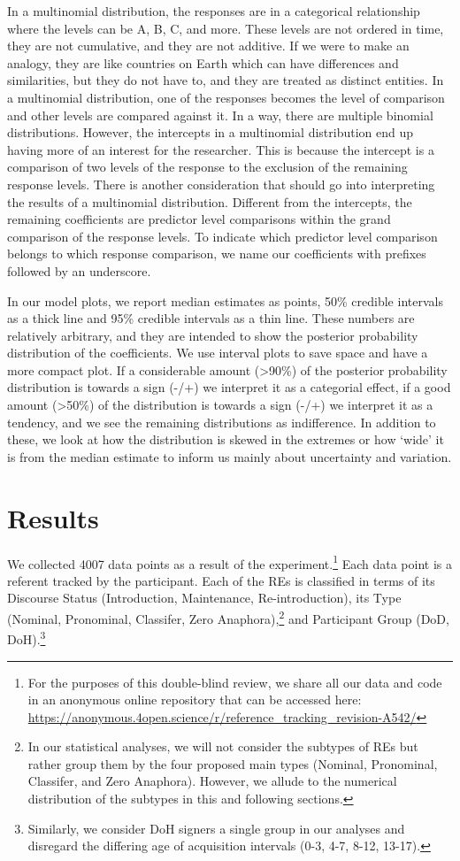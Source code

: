 \documentclass[]{elsarticle} %
\begin{document}
In a multinomial distribution, the responses are in a categorical
relationship where the levels can be A, B, C, and more. These levels are
not ordered in time, they are not cumulative, and they are not additive.
If we were to make an analogy, they are like countries on Earth which
can have differences and similarities, but they do not have to, and they
are treated as distinct entities. In a multinomial distribution, one of
the responses becomes the level of comparison and other levels are
compared against it. In a way, there are multiple binomial
distributions. However, the intercepts in a multinomial distribution end
up having more of an interest for the researcher. This is because the
intercept is a comparison of two levels of the response to the exclusion
of the remaining response levels. There is another consideration that
should go into interpreting the results of a multinomial distribution.
Different from the intercepts, the remaining coefficients are predictor
level comparisons within the grand comparison of the response levels. To
indicate which predictor level comparison belongs to which response
comparison, we name our coefficients with prefixes followed by an
underscore.

In our model plots, we report median estimates as points, 50\% credible
intervals as a thick line and 95\% credible intervals as a thin line.
These numbers are relatively arbitrary, and they are intended to show
the posterior probability distribution of the coefficients. We use
interval plots to save space and have a more compact plot. If a
considerable amount (\textgreater90\%) of the posterior probability
distribution is towards a sign (-/+) we interpret it as a categorial
effect, if a good amount (\textgreater50\%) of the distribution is
towards a sign (-/+) we interpret it as a tendency, and we see the
remaining distributions as indifference. In addition to these, we look
at how the distribution is skewed in the extremes or how `wide' it is
from the median estimate to inform us mainly about uncertainty and
variation.

\hypertarget{results}{%
\section{Results}\label{results}}

We collected 4007 data points as a result of the
experiment.\footnote{For the purposes of this double-blind review, we share all our data and code in an anonymous online repository that can be accessed here: \url{https://anonymous.4open.science/r/reference_tracking_revision-A542/}}
Each data point is a referent tracked by the participant. Each of the
REs is classified in terms of its Discourse Status (Introduction,
Maintenance, Re-introduction), its Type (Nominal, Pronominal, Classifer,
Zero
Anaphora),\footnote{In our statistical analyses, we will not consider the subtypes of REs but rather group them by the four proposed main types (Nominal, Pronominal, Classifer, and Zero Anaphora). However, we allude to the numerical distribution of the subtypes in this and following sections.}
and Participant Group (DoD,
DoH).\footnote{Similarly, we consider DoH signers a single group in our analyses and disregard the differing age of acquisition intervals (0-3, 4-7, 8-12, 13-17).}
\end{document}
